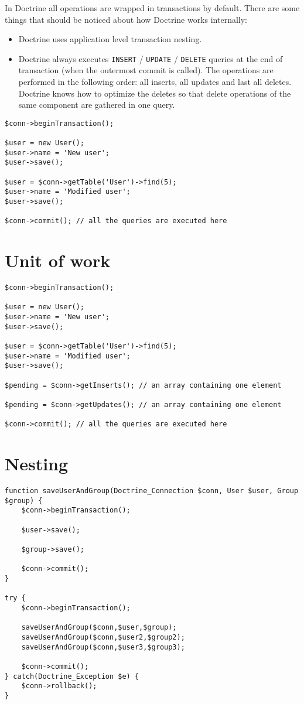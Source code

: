 \documentclass[11pt,a4paper]{report}
\begin{document}
In Doctrine all operations are wrapped in transactions by default. There are some things that should be noticed about how Doctrine works internally:

\begin{itemize}
\item{Doctrine uses application level transaction nesting.}
\item{Doctrine always executes \texttt{INSERT} / \texttt{UPDATE} / \texttt{DELETE} queries at the end of transaction (when the outermost commit is called). The operations are performed in the following order: all inserts, all updates and last all deletes. Doctrine knows how to optimize the deletes so that delete operations of the same component are gathered in one query.}
\end{itemize}
\begin{verbatim}
$conn->beginTransaction();

$user = new User();
$user->name = 'New user';
$user->save();

$user = $conn->getTable('User')->find(5);
$user->name = 'Modified user';
$user->save();

$conn->commit(); // all the queries are executed here
\end{verbatim}

\section{Unit of work}
\begin{verbatim}
$conn->beginTransaction();

$user = new User();
$user->name = 'New user';
$user->save();

$user = $conn->getTable('User')->find(5);
$user->name = 'Modified user';
$user->save();

$pending = $conn->getInserts(); // an array containing one element

$pending = $conn->getUpdates(); // an array containing one element

$conn->commit(); // all the queries are executed here
\end{verbatim}

\section{Nesting}
\begin{verbatim}
function saveUserAndGroup(Doctrine_Connection $conn, User $user, Group $group) {
    $conn->beginTransaction();

    $user->save();

    $group->save();

    $conn->commit();
}

try {
    $conn->beginTransaction();

    saveUserAndGroup($conn,$user,$group);
    saveUserAndGroup($conn,$user2,$group2);
    saveUserAndGroup($conn,$user3,$group3);

    $conn->commit();
} catch(Doctrine_Exception $e) {
    $conn->rollback();
}
\end{verbatim}
\end{document}
